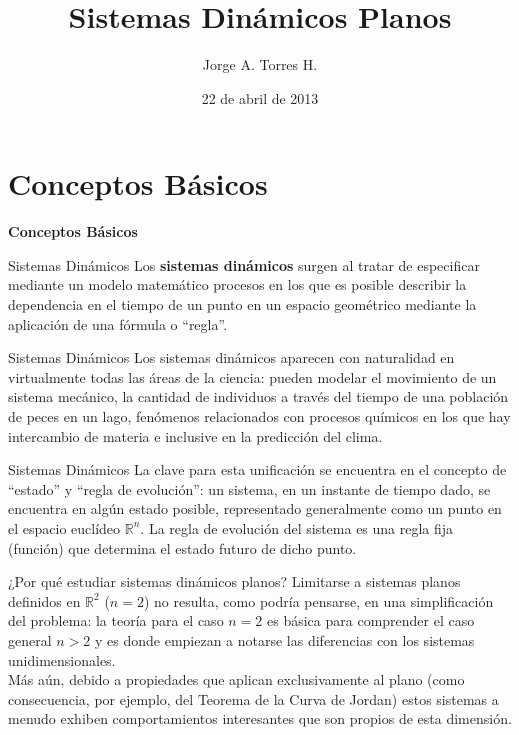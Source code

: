 \documentclass{beamer}
\title[Sistemas Dinámicos Planos]{Sistemas Dinámicos Planos}
\institute[UNAL]{Universidad Nacional de Colombia \\ Medellín \\ \texttt{jatorreshen@unal.edu.co}}
\author{Jorge A. Torres H.}
\date{22 de abril de 2013}
\newcommand{\R}{{\ensuremath{\mathbb{R}}}}
\newcommand{\stframe}[1]{\begin{frame} \begin{center}\Large{\textbf{{#1}}}\end{center}\end{frame}}
\begin{document}
\begin{frame}[plain]
    \titlepage
\end{frame}

\section{Conceptos Básicos}
\stframe{Conceptos Básicos}

\begin{frame}{Sistemas Dinámicos}
Los \textbf{sistemas dinámicos} surgen al tratar de especificar mediante un modelo matemático procesos en los que es posible describir la dependencia en el tiempo de un punto en un espacio geométrico mediante la aplicación de una fórmula o ``regla''.
\end{frame}

\begin{frame}{Sistemas Dinámicos}
Los sistemas dinámicos aparecen con naturalidad en virtualmente todas las áreas de la ciencia: pueden modelar el movimiento de un sistema mecánico, la cantidad de individuos a través del tiempo de una población de peces en un lago, fenómenos relacionados con procesos químicos en los que hay intercambio de materia e inclusive en la predicción del clima.
\end{frame}

\begin{frame}{Sistemas Dinámicos}
La clave para esta unificación se encuentra en el concepto de ``estado'' y ``regla de evolución'': un sistema, en un instante de tiempo dado, se encuentra en algún estado posible, representado generalmente como un punto en el espacio euclídeo $\R^n$. La regla de evolución del sistema es una regla fija (función) que determina el estado futuro de dicho punto.
\end{frame}

\begin{frame}{¿Por qué estudiar sistemas dinámicos planos?}
Limitarse a sistemas planos definidos en $\R^2$ ($n=2$) no resulta, como podría pensarse, en una simplificación del problema: la teoría para el caso $n = 2$ es básica para comprender el caso general $n > 2$ y es donde empiezan a notarse las diferencias con los sistemas unidimensionales. \\
\pause
Más aún, debido a propiedades que aplican exclusivamente al plano (como consecuencia, por ejemplo, del Teorema de la Curva de Jordan) estos sistemas a menudo exhiben comportamientos interesantes que son propios de esta dimensión.
\end{frame}
\end{document}

